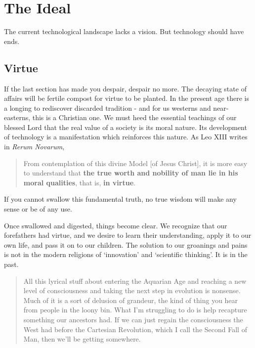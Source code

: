\documentclass[letterpaper]{article}
\begin{document}
\section{The Ideal}

The current technological landscape lacks a vision. But technology should have ends.

\subsection{Virtue}

If the last section has made you despair, despair no more. The decaying state of affairs will be fertile compost for virtue to be planted. In the present age there is a longing to rediscover discarded tradition - and for us westerns and near-easterns, this is a Christian one. We must heed the essential teachings of our blessed Lord that the real value of a society is its moral nature. Its development of technology is a manifestation which reinforces this nature. As Leo XIII writes in \textit{Rerum Novarum},

\begin{quote}
  From contemplation of this divine Model [of Jesus Christ], it is more easy to understand that \textbf{the true worth and nobility of man lie in his moral qualities}, that is, \textbf{in virtue}.
\end{quote}

If you cannot swallow this fundamental truth, no true wisdom will make any sense or be of any use.

Once swallowed and digested, things become clear. We recognize that our forefathers had virtue, and we desire to learn their understanding, apply it to our own life, and pass it on to our children. The solution to our groanings and pains is not in the modern religions of `innovation' and `scientific thinking'. It is in the past.

\begin{quote}
  All this lyrical stuff about entering the Aquarian Age and reaching a new level of consciousness and taking the next step in evolution is nonsense. Much of it is a sort of delusion of grandeur, the kind of thing you hear from people in the loony bin. What I'm struggling to do is help recapture something our ancestors had. If we can just regain the consciousness the West had before the Cartesian Revolution, which I call the Second Fall of Man, then we'll be getting somewhere.

\end{quote}
\end{document}
